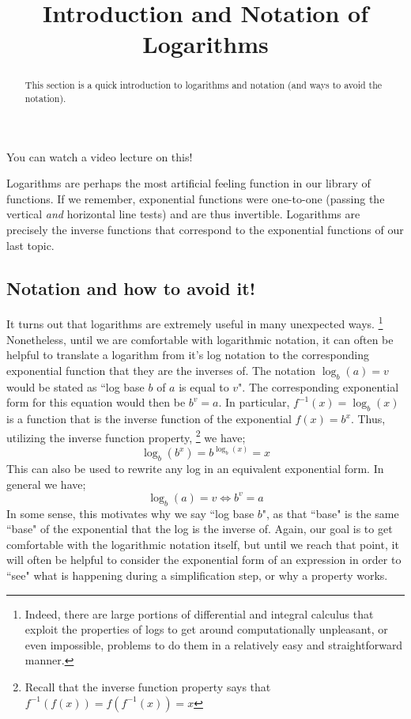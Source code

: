 \documentclass{ximeraXloud}
\title{Introduction and Notation of Logarithms}
\begin{document}
\begin{abstract}
    This section is a quick introduction to logarithms and notation (and ways to avoid the notation).
\end{abstract}
\maketitle

You can watch a video lecture on this!


Logarithms are perhaps the most artificial feeling function in our library of functions. If we remember, exponential functions were one-to-one (passing the vertical \textit{and} horizontal line tests) and are thus invertible. Logarithms are precisely the inverse functions that correspond to the exponential functions of our last topic.

\subsection*{Notation and how to avoid it!}

    It turns out that logarithms are extremely useful in many unexpected ways.%
    \footnote{Indeed, there are large portions of differential and integral calculus that exploit the properties of logs to get around computationally unpleasant, or even impossible, problems to do them in a relatively easy and straightforward manner.}
    Nonetheless, until we are comfortable with logarithmic notation, it can often be helpful to translate a logarithm from it's log notation to the corresponding exponential function that they are the inverses of. The notation $\log_b(a) = v$ would be stated as ``log base $b$ of $a$ is equal to $v$". The corresponding exponential form for this equation would then be $b^v = a$. In particular, $f^{-1}(x) = \log_b(x)$ is a function that is the inverse function of the exponential $f(x)=b^x$. Thus, utilizing the inverse function property,%
    \footnote{Recall that the inverse function property says that $f^{-1}(f(x)) = f(f^{-1}(x)) = x$}
    we have;
    \[
        \log_b(b^x) = b^{\log_b(x)} = x
    \]
    This can also be used to rewrite any log in an equivalent exponential form. In general we have;
    \[
        \log_b(a)=v \iff b^v = a
    \]
    In some sense, this motivates why we say ``log base $b$", as that ``base" is the same ``base" of the exponential that the log is the inverse of. Again, our goal is to get comfortable with the logarithmic notation itself, but until we reach that point, it will often be helpful to consider the exponential form of an expression in order to ``see" what is happening during a simplification step, or why a property works.

%
%
%
%
%
\end{document}
